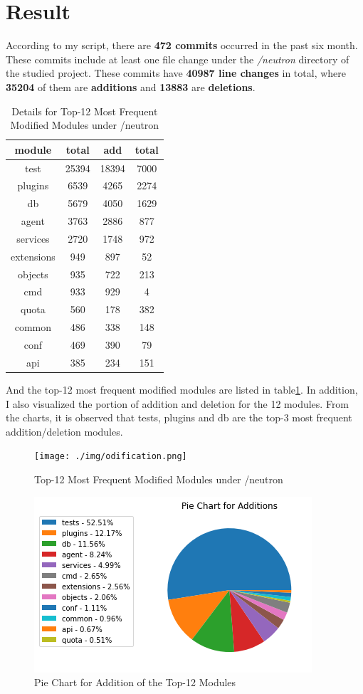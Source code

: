 \documentclass[11pt]{article}
\begin{document}
\section{Result}
According to my script, there are \textbf{472 commits} occurred in the past six month. These commits include at least one file change under the \textit{/neutron} directory of the studied project. These commits have \textbf{40987 line changes} in total, where \textbf{35204} of them are \textbf{additions} and \textbf{13883} are \textbf{deletions}.
\begin{table}[H]
    \centering
    \begin{tabular}{|c|c|c|c|}
         \hline
         module & total & add & total \\
         \hline
         test & 25394 &18394 & 7000\\
         plugins & 6539 & 4265 & 2274\\
         db & 5679 & 4050 & 1629\\
         agent & 3763 & 2886 & 877\\
         services & 2720 & 1748 & 972\\
         extensions & 949 & 897 & 52\\
         objects & 935 & 722 & 213\\
         cmd & 933 & 929 & 4\\
         quota & 560 & 178 & 382\\
         common & 486 & 338 & 148\\
         conf & 469 & 390 & 79\\
         api & 385 & 234 & 151\\
         \hline
    \end{tabular}
    \caption{Details for Top-12 Most Frequent Modified Modules under /neutron}
    \label{tab:1}
\end{table}
And the top-12 most frequent modified modules are listed in table\ref{tab:1}. 
In addition, I also visualized the portion of addition and deletion for the 12 modules. From the charts, it is observed that tests, plugins and db are the top-3 most frequent addition/deletion modules.
\begin{figure}[H]
    \centering
    \texttt{[image: ./img/odification.png]}
    \caption{Top-12 Most Frequent Modified Modules under /neutron}
    \label{fig:1}
\end{figure}
\begin{figure}[H]
    \centering
    \includegraphics[width=0.5\linewidth]{./img/addition_pie.png}
    \caption{Pie Chart for Addition of the Top-12 Modules}
    \label{fig:2}
\end{figure}
\end{document}
